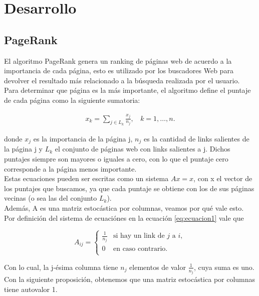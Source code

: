 \section{Desarrollo}

\subsection{PageRank}

El algoritmo PageRank genera un ranking de páginas web de acuerdo a la importancia de cada página, esto es utilizado por los buscadores Web para devolver el resultado más relacionado a la búsqueda realizada por el usuario.\\

Para determinar que página es la más importante, el algoritmo define el puntaje de cada página como la siguiente sumatoria:

\begin{eqnarray}
x_k = \sum_{j \in L_k} \frac{x_j}{n_j},~~~~k = 1,\dots,n.\label{eq:ecuacion1}
\end{eqnarray}

donde $x_{j}$ es la importancia de la página j, $n_{j}$ es la cantidad de links salientes de la página j y $L_{k}$ el conjunto de páginas web con links salientes a j. Dichos puntajes siempre son mayores o iguales a cero, con lo que el puntaje cero corresponde a la página menos importante.\\


Estas ecuaciones pueden ser escritas como un sistema $Ax = x$, con x el vector de los puntajes que buscamos, ya que cada puntaje se obtiene con los de sus páginas vecinas (o sea las del conjunto $L_{k}$).\\

Además, A es una matriz estocástica por columnas, veamos por qué vale esto. Por definición del sistema de ecuaciónes en la ecuación \ref{eq:ecuacion1} vale que

\begin{equation*}
A_{ij} = \left\{
	\begin{array}{cl}
	\frac{1}{n_{j}} & \text{si hay un link de } j \text{ a } i,\\
	0 & \text{en caso contrario.}\\
	\end{array} \right.
\end{equation*}

Con lo cual, la j-ésima columna tiene $n_{j}$ elementos de valor $\frac{1}{n_{j}}$, cuya suma es uno. Con la siguiente proposición, obtenemos que una matriz estocástica por columnas tiene autovalor 1.\\

